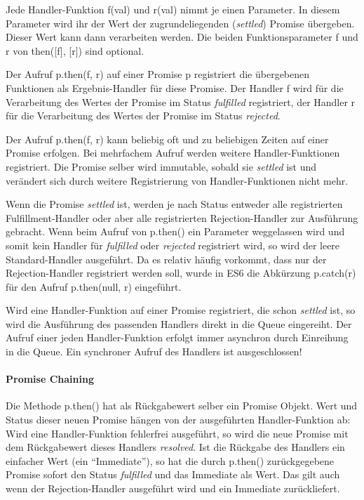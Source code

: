 \documentclass[
11pt, %
a4paper, %
oneside, %
pdfspacing, %
headinclude,
BCOR5mm, %
ngerman, %
bibtotocnumbered,
]{scrartcl}
\begin{document}
			Jede Handler-Funktion \textsf{f(val)} und \textsf{r(val)} nimmt je einen Parameter. In diesem Parameter wird ihr der Wert der zugrundeliegenden (\emph{settled}) Promise übergeben. Dieser Wert kann dann verarbeiten werden. Die beiden Funktionsparameter \textsf{f} und \textsf{r} von \textsf{then([f], [r])} sind optional.
			
			Der Aufruf \textsf{p.then(f, r)} auf einer Promise \textsf{p} registriert die übergebenen Funktionen als Ergebnis-Handler für diese Promise. Der Handler \textsf{f} wird für die Verarbeitung des Wertes der Promise im Status \emph{fulfilled} registriert, der Handler \textsf{r} für die Verarbeitung des Wertes der Promise im Status \emph{rejected}. 
				
			Der Aufruf \textsf{p.then(f, r)} kann beliebig oft und zu beliebigen Zeiten auf einer Promise erfolgen. Bei mehrfachem Aufruf werden weitere Handler-Funktionen registriert. Die Promise selber wird immutable, sobald sie \emph{settled} ist und verändert sich durch weitere Registrierung von Handler-Funktionen nicht mehr.
			
			Wenn die Promise \emph{settled} ist, werden je nach Status entweder alle registrierten Fulfillment-Handler oder aber alle registrierten Rejection-Handler zur Ausführung gebracht. Wenn beim Aufruf von \textsf{p.then()} ein Parameter weggelassen wird und somit kein Handler für \emph{fulfilled} oder \emph{rejected} registriert wird, so wird der leere Standard-Handler ausgeführt. Da es relativ häufig vorkommt, dass nur der Rejection-Handler registriert werden soll, wurde in ES6 die Abkürzung \textsf{p.catch(r)} für den Aufruf \textsf{p.then(null, r)} eingeführt.
			
			Wird eine Handler-Funktion auf einer Promise registriert, die schon \emph{settled} ist, so wird die Ausführung des passenden Handlers direkt in die Queue eingereiht. Der Aufruf einer jeden Handler-Funktion erfolgt immer asynchron durch Einreihung in die Queue. Ein synchroner Aufruf des Handlers ist ausgeschlossen!
			
			
			\paragraph{Promise Chaining} 
			Die Methode \textsf{p.then()} hat als Rückgabewert selber ein Promise Objekt. Wert und Status dieser neuen Promise hängen von der ausgeführten Handler-Funktion ab: Wird eine Handler-Funktion fehlerfrei ausgeführt, so wird die neue Promise mit dem Rückgabewert dieses Handlers \emph{resolved}. 
			Ist die Rückgabe des Handlers ein einfacher Wert (ein "`Immediate"'), so hat die durch \textsf{p.then()} zurückgegebene Promise sofort den Status \emph{fulfilled} und das Immediate als Wert. Das gilt auch wenn der Rejection-Handler ausgeführt wird und ein Immediate zurückliefert.
			
\end{document}

